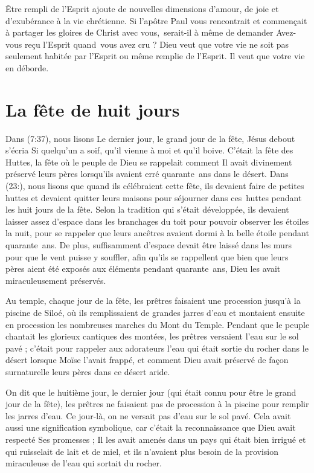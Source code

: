 Être rempli de l'Esprit ajoute de nouvelles dimensions d'amour,
 de joie et d'exubérance à la vie chrétienne.
 Si l'apôtre Paul vous rencontrait et commençait à partager les gloires
 de Christ avec vous,~serait-il à même de demander\frcolon{}
 \Og Avez-vous reçu l'Esprit quand~vous avez cru ? \Fg{}
 Dieu veut que votre vie ne soit pas seulement habitée
 par l'Esprit ou même remplie de l'Esprit.
 Il veut que votre vie en déborde.


\section{La f\^ete de huit jours}

Dans (7:37), nous lisons\frcolon{}
 \Og Le dernier jour, le grand jour de la fête, Jésus debout s'écria\frcolon{}
 Si quelqu'un a soif, qu'il vienne à moi et qu'il boive. \Fg{}
 C'était la fête des Huttes, la fête où le peuple de Dieu se rappelait
 comment Il avait divinement préservé leurs pères lorsqu'ils avaient erré
 quarante~ans dans le désert.
 Dans (23:), nous lisons que quand ils célébraient cette fête,
 ils devaient faire de petites huttes et devaient quitter leurs maisons
 pour séjourner dans ces~huttes pendant les huit jours de la fête.
 Selon la tradition qui s'était développée, ils devaient laisser assez d'espace
 dans les branchages du toit pour pouvoir observer les étoiles la nuit,
 pour se rappeler que leurs ancêtres avaient dormi à la belle étoile
 pendant quarante~ans. De plus, suffisamment d'espace devait être laissé
 dans les murs pour que le vent puisse y souffler, afin qu'ils se rappellent
 que bien que leurs pères aient été exposés aux éléments pendant quarante~ans,
 Dieu les avait miraculeusement préservés.

Au temple, chaque jour de la fête, les prêtres faisaient une procession
 jusqu'à la piscine de Siloé, où ils remplissaient de grandes jarres d'eau
 et montaient ensuite en procession les nombreuses marches du Mont du Temple.
 Pendant que le peuple chantait les glorieux cantiques des montées,
 les prêtres versaient l'eau sur le sol pavé ; c'était pour rappeler
 aux adorateurs l'eau qui était sortie du rocher dans le désert lorsque Moïse
 l'avait frappé, et comment Dieu avait préservé de façon surnaturelle
 leurs pères dans ce désert aride. 

On dit que le huitième jour, le dernier jour (qui était connu pour être
 le grand jour de la fête), les prêtres ne faisaient pas de procession
 à la piscine pour remplir les jarres d'eau.
 Ce jour-là, on ne versait pas d'eau sur le sol pavé.
 Cela avait aussi une signification symbolique, car c'était la reconnaissance
 que Dieu avait respecté Ses promesses ; Il les avait amenés dans un pays
 qui était bien irrigué et qui ruisselait de lait et de miel,
 et ils n'avaient plus besoin de la provision miraculeuse de l'eau
 qui sortait du rocher.

